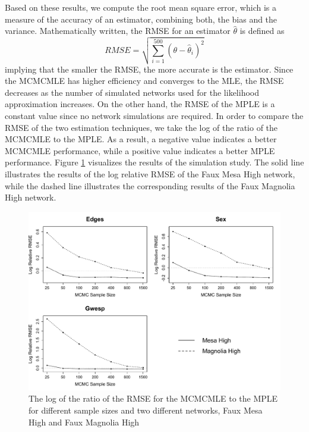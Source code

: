 \documentclass[headsepline=true, abstracton]{scrartcl}
\begin{document}
Based on these results, we compute the root mean square error, which is a measure of the accuracy of an estimator, combining both, the bias and the variance. Mathematically written, the RMSE for an estimator $\hat{\theta}$ is defined as 
$$RMSE = \sqrt{\sum_{i=1}^{500}(\theta - \hat{\theta}_i)^2}$$
implying that the smaller the RMSE, the more accurate is the estimator. Since the MCMCMLE has higher efficiency and converges to the MLE, the RMSE decreases as the number of simulated networks used for the likelihood approximation increases. On the other hand, the RMSE of the MPLE is a constant value since no network simulations are required. In order to compare the RMSE of the two estimation techniques, we take the log of the ratio of the MCMCMLE to the MPLE. As a result, a negative value indicates a better MCMCMLE performance, while a positive value indicates a better MPLE performance. Figure \ref{rmse} visualizes the results of the simulation study. The solid line illustrates the results of the log relative RMSE of the Faux Mesa High network, while the dashed line illustrates the corresponding results of the Faux Magnolia High network. 

\begin{figure}[h]
\begin{center}
\includegraphics[scale=.5]{RMSE_paper}
\caption{The log of the ratio of the RMSE for the MCMCMLE to the MPLE for different sample sizes and two different networks, Faux Mesa High and Faux Magnolia High}
\label{rmse}
\end{center}
\end{figure}
\end{document}
